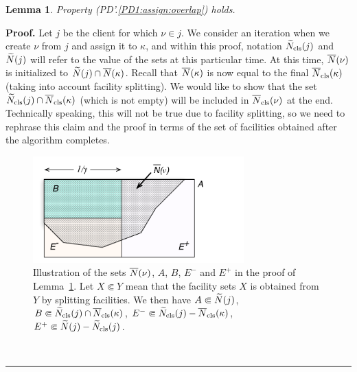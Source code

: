 \documentclass[oneside,final]{ucr}
\newtheorem{lemma}[theorem]{Lemma}
\newenvironment{proof}[1][Proof]{\textbf{#1.} }{\ \rule{0.5em}{0.5em}}
\begin{document}

\begin{lemma} \label{lem: PD1: primary overlap}
  Property (PD'.\ref{PD1:assign:overlap}) holds.
\end{lemma}
\begin{proof}
  Let $j$ be the client for which $\nu\in j$. We consider an iteration
  when we create $\nu$ from $j$ and assign it to $\kappa$, and
  within this proof, notation ${\widetilde N}_{{\mbox{\scriptsize\rm cls}}}(j)$ and ${\widetilde N}(j)$
  will refer to the value of the sets at this particular time.  
At this time, ${\overline{N}}(\nu)$ is initialized to ${\widetilde N}(j)\cap
  {\overline{N}}(\kappa)$.  Recall that ${\overline{N}}(\kappa)$ is now equal to the
  final ${\overline{N}}_{{\mbox{\scriptsize\rm cls}}}(\kappa)$ (taking into account facility splitting). We
  would like to show that the set ${\widetilde N}_{{\mbox{\scriptsize\rm cls}}}(j)\cap
  {\overline{N}}_{{\mbox{\scriptsize\rm cls}}}(\kappa)$ (which is not empty) will be included in
  ${\overline{N}}_{{\mbox{\scriptsize\rm cls}}}(\nu)$ at the end. Technically speaking, this will not be
  true due to facility splitting, so we need to rephrase this claim
  and the proof in terms of the set of facilities obtained after the
  algorithm completes.

\begin{figure}[ht]
\begin{center}
\includegraphics[width=3.2in]{proof_of_lemma_PD'3a.pdf}
\caption[Illustration of the sets in the proof of
Lemma~\ref{lem: PD1: primary overlap}]{Illustration of the
  sets ${\overline{N}}(\nu)$, $A$, $B$, $E^-$ and $E^+$ in the proof
  of Lemma~\ref{lem: PD1: primary overlap}. Let $X \Subset
  Y$ mean that the facility sets $X$ is obtained from $Y$ by
  splitting facilities.  We then have $A \Subset
  {\widetilde N}(j)$, $B \Subset {\widetilde N}_{{\mbox{\scriptsize\rm cls}}}(j) \cap
  {\overline{N}}_{{\mbox{\scriptsize\rm cls}}}(\kappa)$, $E^- \Subset {\widetilde N}_{{\mbox{\scriptsize\rm cls}}}(j) -
  {\overline{N}}_{{\mbox{\scriptsize\rm cls}}}(\kappa)$, $E^+ \Subset {\widetilde N}(j) -
  {\widetilde N}_{{\mbox{\scriptsize\rm cls}}}(j)$.}
\label{fig: sets lemma PD'3a}
\end{center}
\end{figure}


\end{proof}
\end{document}
